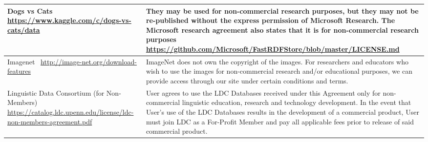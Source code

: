 \documentclass{article} %
\begin{document}
\begin{table}[h]
\begin{tabular}{ll}
\multicolumn{1}{|p{7cm}|}{Dogs vs Cats
\newline
\url{https://www.kaggle.com/c/dogs-vs-cats/data}} & \multicolumn{1}{|p{7cm}|}{They may be used for non-commercial research purposes, but they may not be re-published without the express permission of Microsoft Research. The Microsoft research agreement also states that it is for non-commercial research purposes \newline \url{https://github.com/Microsoft/FastRDFStore/blob/master/LICENSE.md}} \\ \hline


\multicolumn{1}{|p{7cm}|}{Imagenet~\citep{imagenet_cvpr09}
\newline
\url{http://image-net.org/download-features}} & \multicolumn{1}{|p{7cm}|}{ImageNet does not own the copyright of the images. For researchers and educators who wish to use the images for non-commercial research and/or educational purposes, we can provide access through our site under certain conditions and terms.} \\ \hline


\multicolumn{1}{|p{7cm}|}{Linguistic Data Consortium (for Non-Members) \newline \url{https://catalog.ldc.upenn.edu/license/ldc-non-members-agreement.pdf}} & \multicolumn{1}{|p{7cm}|}{User agrees to use the LDC Databases received under this Agreement only for non-commercial linguistic education, research and technology development. In the event that User’s use of the LDC Databases results in the development of a commercial product, User must join LDC as a For-Profit Member and pay all applicable fees prior to release of said commercial product.} \\ \hline

\end{tabular}
\end{table}


\end{document}
